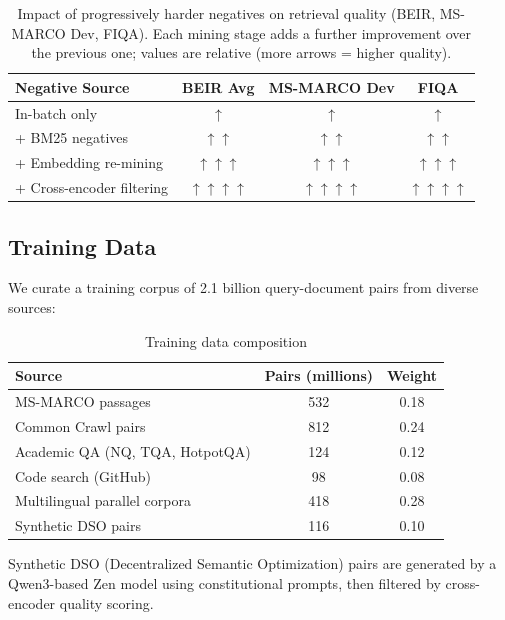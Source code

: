 \documentclass[11pt,a4paper]{article}
\begin{document}
\begin{table}[H]
\centering
\caption{Impact of progressively harder negatives on retrieval quality (BEIR, MS-MARCO
Dev, FIQA). Each mining stage adds a further improvement over the previous one; values
are relative (more arrows = higher quality).}
\label{tab:hard_neg}
\begin{tabular}{lccc}
\toprule
Negative Source & BEIR Avg & MS-MARCO Dev & FIQA \\
\midrule
In-batch only            & $\uparrow$    & $\uparrow$    & $\uparrow$ \\
+ BM25 negatives         & $\uparrow\uparrow$   & $\uparrow\uparrow$   & $\uparrow\uparrow$ \\
+ Embedding re-mining    & $\uparrow\uparrow\uparrow$  & $\uparrow\uparrow\uparrow$  & $\uparrow\uparrow\uparrow$ \\
+ Cross-encoder filtering & $\uparrow\uparrow\uparrow\uparrow$ & $\uparrow\uparrow\uparrow\uparrow$ & $\uparrow\uparrow\uparrow\uparrow$ \\
\bottomrule
\end{tabular}
\end{table}

\subsection{Training Data}

We curate a training corpus of 2.1 billion query-document pairs from diverse sources:

\begin{table}[H]
\centering
\caption{Training data composition}
\label{tab:training_data}
\begin{tabular}{lcc}
\toprule
Source & Pairs (millions) & Weight \\
\midrule
MS-MARCO passages & 532 & 0.18 \\
Common Crawl pairs & 812 & 0.24 \\
Academic QA (NQ, TQA, HotpotQA) & 124 & 0.12 \\
Code search (GitHub) & 98 & 0.08 \\
Multilingual parallel corpora & 418 & 0.28 \\
Synthetic DSO pairs & 116 & 0.10 \\
\bottomrule
\end{tabular}
\end{table}

Synthetic DSO (Decentralized Semantic Optimization) pairs are generated by a Qwen3-based Zen model using constitutional prompts, then filtered by cross-encoder quality scoring.
\end{document}
